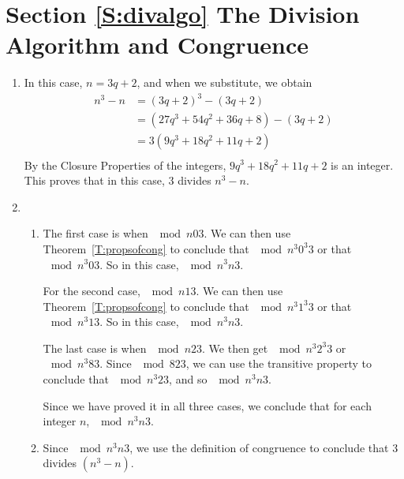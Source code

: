 \section*{Section \ref{S:divalgo} The Division Algorithm and Congruence}


\begin{enumerate}

\item In this case,  $n = 3q + 2$, and when we substitute, we obtain
\[
\begin{aligned}
  n^3  - n &= \left( {3q + 2} \right)^3  - \left( {3q + 2} \right) \\ 
           &= \left( {27q^3  + 54q^2  + 36q + 8} \right) - \left( {3q + 2} \right) \\ 
           &= 3\left( {9q^3  + 18q^2  + 11q + 2} \right) \\ 
\end{aligned} 
\]
By the Closure Properties of the integers,  $9q^3  + 18q^2  + 11q + 2$  is an integer.  This proves that in this case, 3  divides  $n^3  - n$.

\item \begin{enumerate}
\item The first case is when $\mod{n}{0}{3}$.  We can then use Theorem~\ref{T:propsofcong} to conclude that $\mod{n^3}{0^3}{3}$ or that $\mod{n^3}{0}{3}$.  So in this case, $\mod{n^3}{n}{3}$.

\noindent
For the second case, $\mod{n}{1}{3}$.  We can then use Theorem~\ref{T:propsofcong} to conclude that $\mod{n^3}{1^3}{3}$ or that $\mod{n^3}{1}{3}$.  So in this case, $\mod{n^3}{n}{3}$.

\noindent
The last case is when $\mod{n}{2}{3}$.  We then get $\mod{n^3}{2^3}{3}$ or $\mod{n^3}{8}{3}$.  Since $\mod{8}{2}{3}$, we can use the transitive property to conclude that $\mod{n^3}{2}{3}$, and so $\mod{n^3}{n}{3}$.

\noindent
Since we have proved it in all three cases, we conclude that for each integer $n$, $\mod{n^3}{n}{3}$.

\item Since $\mod{n^3}{n}{3}$, we use the definition of congruence to conclude that 3 divides $\left( n^3 - n \right)$.
\end{enumerate}




\end{enumerate}
